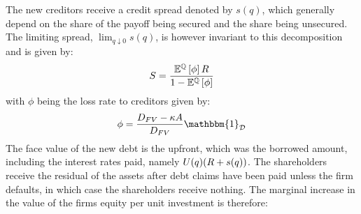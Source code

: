 \documentclass[../main.tex]{subfiles}
\begin{document}
        The new creditors receive a credit spread denoted by $s(q)$,
        which generally depend on the share of the payoff being secured and the share being unsecured.
        The limiting spread, $\lim_{q\downarrow0}s(q)$,
        is however invariant to this decomposition and is given by:
            \begin{equation}
                S = \frac{
                    \mathbb{E}^{\mathbb{Q}}\left[\phi\right] 
                    R
                }{
                    1 - \mathbb{E}^{\mathbb{Q}}\left[\phi\right]
                }
            \end{equation}
        with $\phi$ being the loss rate to creditors given by:
            \begin{equation}
                \phi = \frac{
                        D_{FV} - \kappa A
                    }{
                        D_{FV}
                    } 
                \mathbbm{1}_{\mathcal{D}}
            \end{equation}
        The face value of the new debt is the upfront, which was the borrowed amount, 
        including the interest rates paid, namely 
        $U(q)(R + s(q))$. 
        The shareholders receive the residual of the assets after debt claims have been paid
        unless the firm defaults, in which case the shareholders receive nothing. 
        The marginal increase in the value of the firms equity per unit investment is therefore:
\end{document}
